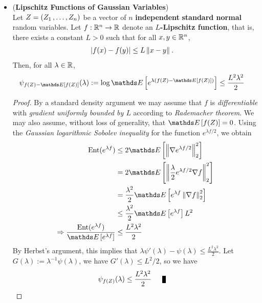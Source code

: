 \documentclass[11pt]{article}
\begin{document}
\begin{itemize}
\item \begin{theorem} (\textbf{Lipschitz Functions of Gaussian Variables}) \citep{boucheron2013concentration} \\
Let $Z = (Z_1 \,{,}\ldots{,}\, Z_n)$ be a vector of $n$ \textbf{independent} \textbf{standard normal} random variables. Let $f : {\mathbb R}^n \to {\mathbb R}$ denote an \textbf{$L$-Lipschitz function}, that is, there exists a constant $L > 0$ such that for all $x, y \in {\mathbb R}^n$,
\begin{align*}
\left\lvert f(x) - f(y) \right\rvert &\le  L\left\|x - y\right\|_{}.
\end{align*} Then, for all $\lambda \in {\mathbb R}$,
\begin{align}
\psi_{f(Z) - \E{}{f(Z)}}(\lambda) := \log \E{}{e^{\lambda\paren{f(Z) - \E{}{f(Z)}}}} &\le \frac{L^2 \lambda^2}{2} \label{ineqn: lip_fun_gaussian}
\end{align}
\end{theorem}
\begin{proof}
By a standard density argument we may assume that $f$ is \emph{differentiable} with \emph{gradient uniformly bounded by $L$} according to \emph{Rademacher theorem}. We may also assume, without loss of generality, that $\E{}{f(Z)} = 0$.  Using the \emph{Gaussian logarithmic Sobolev inequality} for the function $e^{\lambda f/2}$, we obtain
\begin{align*}
\text{Ent}(e^{\lambda f}) &\le 2 \E{}{\norm{\nabla e^{\lambda f/2}}{2}^2} \\
&= 2 \E{}{\norm{\frac{\lambda}{2}e^{\lambda f/2}  \nabla f}{2}^2} \\
&= \frac{\lambda^2}{2} \E{}{e^{\lambda f} \norm{ \nabla f}{2}^2} \\
&\le  \frac{\lambda^2}{2} \E{}{e^{\lambda f}} L^2 \\
\Rightarrow  \frac{\text{Ent}(e^{\lambda f}) }{\E{}{e^{\lambda f}}} &\le \frac{L^2 \lambda^2}{2}
\end{align*} By Herbst's argument, this implies that $\lambda \psi'(\lambda) - \psi(\lambda) \le \frac{L^2 \lambda^2}{2}$. Let $G(\lambda) := \lambda^{-1}\psi(\lambda)$, we have  $G'(\lambda) \le L^2/2$, so we have
\begin{align*}
\psi_{f(Z)}(\lambda) &\le   \frac{L^2 \lambda^2}{2} \qed
\end{align*}
\end{proof}


\end{itemize}
\end{document}
